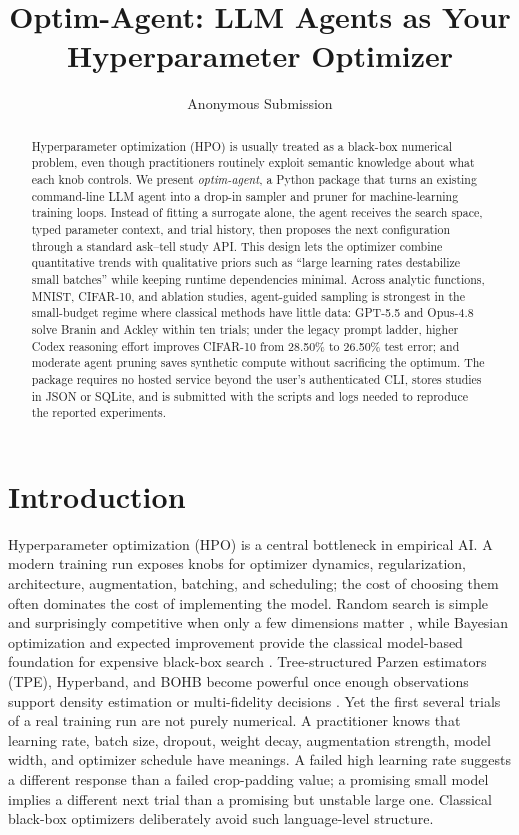 \documentclass[letterpaper]{article}
\title{Optim-Agent: LLM Agents as Your Hyperparameter Optimizer}
\author{Anonymous Submission}
\begin{document}
\maketitle

\begin{abstract}
Hyperparameter optimization (HPO) is usually treated as a black-box numerical
problem, even though practitioners routinely exploit semantic knowledge about
what each knob controls. We present \emph{optim-agent}, a Python package that
turns an existing command-line LLM agent into a drop-in sampler and pruner for
machine-learning training loops. Instead of fitting a surrogate alone, the
agent receives the search space, typed parameter context, and trial history,
then proposes the next configuration through a standard ask--tell study API.
This design lets the optimizer combine quantitative trends with qualitative
priors such as ``large learning rates destabilize small batches'' while keeping
runtime dependencies minimal. Across analytic functions, MNIST, CIFAR-10, and
ablation studies, agent-guided sampling is strongest in the small-budget regime
where classical methods have little data: GPT-5.5 and Opus-4.8 solve Branin and
Ackley within ten trials; under the legacy prompt ladder, higher Codex reasoning
effort improves CIFAR-10 from 28.50\% to 26.50\% test error; and moderate agent
pruning saves synthetic compute without sacrificing the optimum. The package
requires no hosted service beyond the user's authenticated CLI, stores studies
in JSON or SQLite, and is submitted with the scripts and logs needed to
reproduce the reported experiments.
\end{abstract}

\section{Introduction}

Hyperparameter optimization (HPO) is a central bottleneck in empirical AI. A
modern training run exposes knobs for optimizer dynamics, regularization,
architecture, augmentation, batching, and scheduling; the cost of choosing them
often dominates the cost of implementing the model. Random search is simple and
surprisingly competitive when only a few dimensions matter
\cite{bergstra2012random}, while Bayesian optimization and expected improvement
provide the classical model-based foundation for expensive black-box search
\cite{mockus1978application,jones1998efficient,snoek2012practical,shahriari2016taking}.
Tree-structured Parzen estimators (TPE), Hyperband, and BOHB become powerful
once enough observations support density estimation or multi-fidelity decisions
\cite{bergstra2011algorithms,akiba2019optuna,li2017hyperband,falkner2018bohb}.
Yet the first several trials of a real training run are not purely numerical.
A practitioner knows that learning rate, batch size, dropout, weight decay,
augmentation strength, model width, and optimizer schedule have meanings. A
failed high learning rate suggests a different response than a failed
crop-padding value; a promising small model implies a different next trial than
a promising but unstable large one. Classical black-box optimizers deliberately
avoid such language-level structure.
\end{document}
